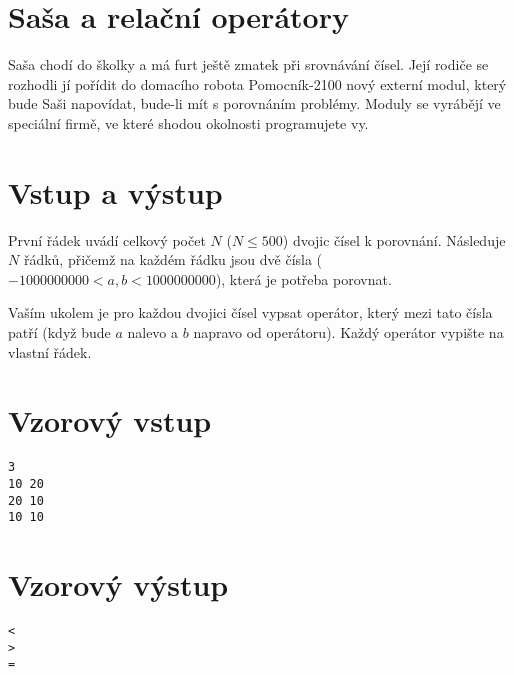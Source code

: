\documentclass{article}
\begin{document}
\section*{\Huge Saša a relační operátory}
Saša chodí do školky a má furt ještě zmatek při srovnávání čísel. Její rodiče se rozhodli jí pořídit do domacího robota Pomocník-2100 nový externí modul, který bude Saši napovídat, bude-li mít s porovnáním problémy. Moduly se vyrábějí ve speciální firmě, ve které shodou okolnosti programujete vy.

\section*{Vstup a výstup}
První řádek uvádí celkový počet $N$ ($N \leq 500$) dvojic čísel k porovnání. Následuje $N$ řádků, přičemž na každém řádku jsou dvě čísla ($-1000000000 < a, b < 1000000000$), která je potřeba porovnat.

Vaším ukolem je pro každou dvojici čísel vypsat operátor, který mezi tato čísla patří (když bude $a$ nalevo a $b$ napravo od operátoru). Každý operátor vypište na vlastní řádek.

\section*{Vzorový vstup}
\begin{verbatim}
3
10 20
20 10
10 10
\end{verbatim}

\section*{Vzorový výstup}
\begin{verbatim}
<
>
=
\end{verbatim}
\end{document}
